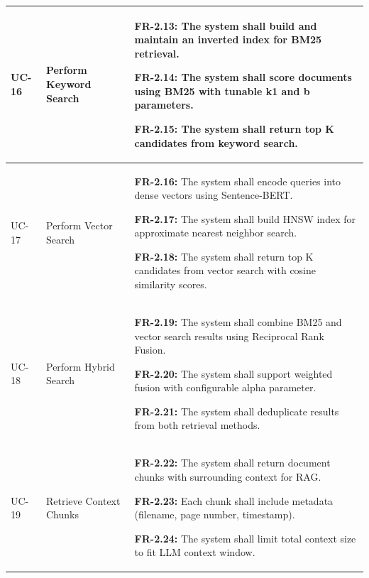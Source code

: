\begin{longtable}{|>{\raggedright\arraybackslash}p{}|>{\raggedright\arraybackslash}p{}|>{\raggedright\arraybackslash}p{}|}
UC-16 & Perform Keyword Search &
\begin{frequirements}
\item \textbf{FR-2.13:} The system shall build and maintain an inverted index for BM25 retrieval.
\item \textbf{FR-2.14:} The system shall score documents using BM25 with tunable k1 and b parameters.
\item \textbf{FR-2.15:} The system shall return top K candidates from keyword search.
\end{frequirements} \\
\hline

UC-17 & Perform Vector Search &
\begin{frequirements}
\item \textbf{FR-2.16:} The system shall encode queries into dense vectors using Sentence-BERT.
\item \textbf{FR-2.17:} The system shall build HNSW index for approximate nearest neighbor search.
\item \textbf{FR-2.18:} The system shall return top K candidates from vector search with cosine similarity scores.
\end{frequirements} \\
\hline

UC-18 & Perform Hybrid Search &
\begin{frequirements}
\item \textbf{FR-2.19:} The system shall combine BM25 and vector search results using Reciprocal Rank Fusion.
\item \textbf{FR-2.20:} The system shall support weighted fusion with configurable alpha parameter.
\item \textbf{FR-2.21:} The system shall deduplicate results from both retrieval methods.
\end{frequirements} \\
\hline

UC-19 & Retrieve Context Chunks &
\begin{frequirements}
\item \textbf{FR-2.22:} The system shall return document chunks with surrounding context for RAG.
\item \textbf{FR-2.23:} Each chunk shall include metadata (filename, page number, timestamp).
\item \textbf{FR-2.24:} The system shall limit total context size to fit LLM context window.
\end{frequirements} \\
\hline


\end{longtable}
